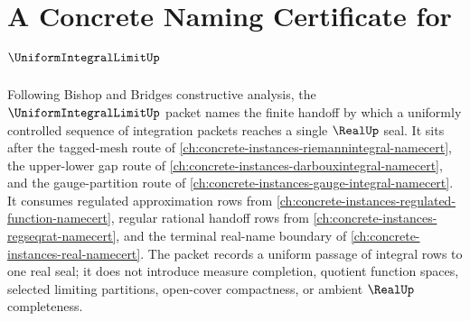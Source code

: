 \chapter{A Concrete Naming Certificate for $\UniformIntegralLimitUp$}
\label{ch:concrete-instances-uniform-integral-limit-namecert}

Following Bishop and Bridges constructive analysis, the $\UniformIntegralLimitUp$ packet names the finite handoff by which a uniformly controlled sequence of integration packets reaches a single $\RealUp$ seal. It sits after the tagged-mesh route of \autoref{ch:concrete-instances-riemannintegral-namecert}, the upper-lower gap route of \autoref{ch:concrete-instances-darbouxintegral-namecert}, and the gauge-partition route of \autoref{ch:concrete-instances-gauge-integral-namecert}. It consumes regulated approximation rows from \autoref{ch:concrete-instances-regulated-function-namecert}, regular rational handoff rows from \autoref{ch:concrete-instances-regseqrat-namecert}, and the terminal real-name boundary of \autoref{ch:concrete-instances-real-namecert}. The packet records a uniform passage of integral rows to one real seal; it does not introduce measure completion, quotient function spaces, selected limiting partitions, open-cover compactness, or ambient $\RealUp$ completeness.

